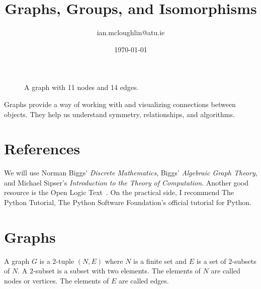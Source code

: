 \documentclass{iansnotes}
\title{Graphs, Groups, and Isomorphisms}
\author{ian.mcloughlin@atu.ie}
\date{\today}
\begin{document}
\maketitle

\begin{figure}
  \centering
  \caption{A graph with 11 nodes and 14 edges.}
  \label{figure:agraph}
\end{figure}

Graphs provide a way of working with and visualizing connections between objects.
They help us understand symmetry, relationships, and algorithms.

\section{References}
  We will use Norman Biggs' \emph{Discrete Mathematics}\autocite{biggs}, Biggs' \emph{Algebraic Graph Theory}\autocite{biggs_1974}, and Michael Sipser's \emph{Introduction to the Theory of Computation}\autocite{sipser}.
  Another good resource is the Open Logic Text~\autocite{openlogictext}.
  On the practical side, I recommend The Python Tutorial\autocite{pythontutorial}, The Python Software Foundation's official tutorial for Python.


\section{Graphs} 
  A graph $G$ is a $2$-tuple $(N, E)$ where $N$ is a finite set and $E$ is a set of $2$-subsets of $N$.
  A $2$-subset is a subset with two elements.
  The elements of $N$ are called nodes or vertices.
  The elements of $E$ are called edges.
\end{document}
